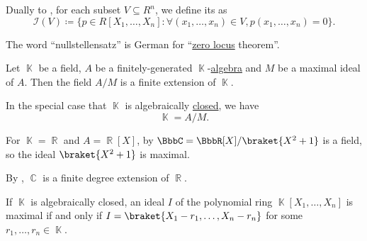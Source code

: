 \begin{definition}\label{def:ideal_of_affine_variety}
  Dually to , for each subset \( V \subseteq R^n \), we define its  as
  \begin{equation*}
    \mathcal{I}(V) \coloneqq \{ p \in R[X_1, \ldots, X_n] \colon \forall (x_1, \ldots, x_n) \in V, p(x_1, \ldots, x_n) = 0 \}.
  \end{equation*}
\end{definition}

\begin{remark}\label{rem:nullstelletsatz_etymology}
  The word \enquote{nullstellensatz} is German for \enquote{\hyperref[def:zero_locus]{zero locus} theorem}.
\end{remark}

\begin{theorem}\label{thm:algebraic_nullstellensatz}
  Let \( \BbbK \) be a field, \( A \) be a finitely-generated \( \BbbK \)-\hyperref[def:algebra_over_semiring]{algebra} and \( M \) be a maximal ideal of \( A \). Then the field \( A / M \) is a finite extension of \( \BbbK \).

  In the special case that \( \BbbK \) is algebraically \hyperref[def:algebraically_closed_field]{closed}, we have
  \begin{equation*}
    \BbbK = A / M.
  \end{equation*}
\end{theorem}

\begin{example}\label{ex:algebraic_nullstellensatz_real_over_complex}
  For \( \BbbK = \BbbR \) and \( A = \BbbR[X] \), by  \( \BbbC = \BbbR[X] / \braket{X^2 + 1} \) is a field, so the ideal \( \braket{X^2 + 1} \) is maximal.

  By , \( \BbbC \) is a finite degree extension of \( \BbbR \).
\end{example}

\begin{corollary}\label{thm:closed_field_maximal_ideal_representation}
  If \( \BbbK \) is algebraically closed, an ideal \( I \) of the polynomial ring \( \BbbK[X_1, \ldots, X_n] \) is maximal if and only if \( I = \braket{X_1 - r_1, \ldots, X_n - r_n} \) for some \( r_1, \ldots, r_n \in \BbbK \).
\end{corollary}

